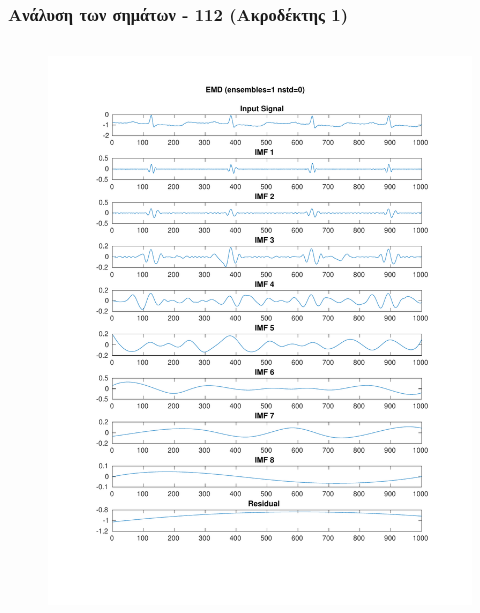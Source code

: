 \documentclass{beamer}
\begin{document}
\begin{frame}
\frametitle{Ανάλυση των σημάτων - 112 (Ακροδέκτης 1)}

\begin{columns}
\begin{figure}
\includegraphics[width=\textwidth]{fig/112l1_emd.pdf}
\end{figure}


\end{columns}
\end{frame}
\end{document}

